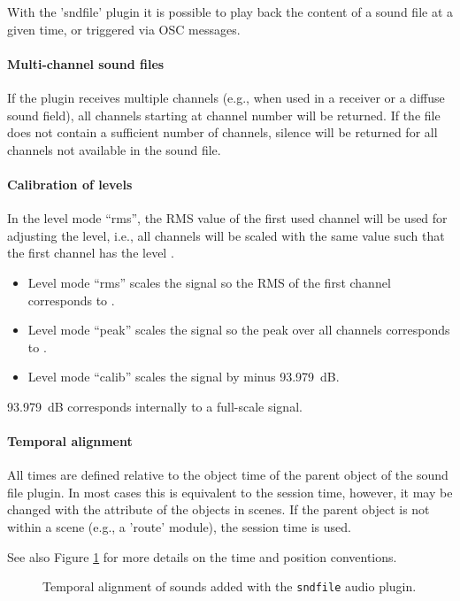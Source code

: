 With the 'sndfile' plugin it is possible to play back the content of a
sound file at a given time, or triggered via OSC messages.



\paragraph{Multi-channel sound files}
%
If the plugin receives multiple channels (e.g., when used in a
receiver or a diffuse sound field), all channels starting at channel
number  will be returned. If the file does not contain a
sufficient number of channels, silence will be returned for all
channels not available in the sound file.

\paragraph{Calibration of levels}
%
In the level mode ``rms'', the RMS value of the first used channel
will be used for adjusting the level, i.e., all channels will be
scaled with the same value such that the first channel has the
level .
\begin{itemize}
\item Level mode ``rms'' scales the signal so the RMS of the first channel corresponds to .

\item Level mode ``peak'' scales the signal so the peak over all channels corresponds to .

\item Level mode ``calib'' scales the signal by  minus 93.979~dB.
\end{itemize}
93.979~dB corresponds internally to a full-scale signal.

\paragraph{Temporal alignment}
%
All times are defined relative to the object time of the parent object
of the sound file plugin. In most cases this is equivalent to the
session time, however, it may be changed with the 
attribute of the objects in scenes. If the parent object is not within
a scene (e.g., a 'route' module), the session time is used.

See also Figure \ref{fig:ap_sndfile} for more details on the time and position conventions.

\begin{figure}[htb]
    \centering
    \caption{Temporal alignment of sounds added with the {\tt sndfile} audio plugin.}
    \label{fig:ap_sndfile}
\end{figure}

